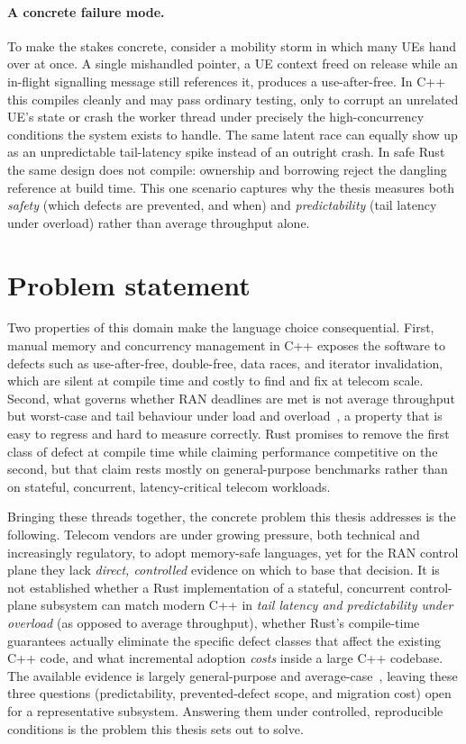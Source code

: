 \documentclass[english,twoside,openright,a4paper,censored,csm,software-track-2020]{HYthesisML}
\begin{document}
\paragraph{A concrete failure mode.}
To make the stakes concrete, consider a mobility storm in which many UEs hand over at once. A
single mishandled pointer, a UE context freed on release while an in-flight signalling message
still references it, produces a use-after-free. In C++ this compiles cleanly and may pass
ordinary testing, only to corrupt an unrelated UE's state or crash the worker thread under
precisely the high-concurrency conditions the system exists to handle. The same latent race
can equally show up as an unpredictable tail-latency spike instead of an outright crash. In
safe Rust the same design does not compile: ownership and borrowing reject the dangling
reference at build time. This one scenario captures why the thesis measures both
\emph{safety} (which defects are prevented, and when) and \emph{predictability} (tail
latency under overload) rather than average throughput alone.

\section{Problem statement}
Two properties of this domain make the language choice consequential. First, manual memory and
concurrency management in C++ exposes the software to defects such as use-after-free,
double-free, data races, and iterator invalidation, which are silent at compile time and costly
to find and fix at telecom scale. Second, what governs whether RAN deadlines are met is not
average throughput but worst-case and tail behaviour under load and
overload~\cite{dean2013tail}, a property that is easy to regress and hard to measure correctly.
Rust promises to remove the first class of defect at compile time while claiming performance
competitive on the second, but that claim rests mostly on general-purpose benchmarks rather
than on stateful, concurrent, latency-critical telecom workloads.

Bringing these threads together, the concrete problem this thesis addresses is the following.
Telecom vendors are under growing pressure, both technical and increasingly regulatory, to adopt
memory-safe languages, yet for the RAN control plane they lack \emph{direct, controlled}
evidence on which to base that decision. It is not established whether a Rust implementation of
a stateful, concurrent control-plane subsystem can match modern C++ in \emph{tail latency and
predictability under overload} (as opposed to average throughput), whether Rust's compile-time
guarantees actually eliminate the specific defect classes that affect the existing C++ code,
and what incremental adoption \emph{costs} inside a large C++ codebase. The available evidence
is largely general-purpose and average-case~\cite{balasubramanian2017rust,qin2020rust}, leaving
these three questions (predictability, prevented-defect scope, and migration cost) open for a
representative subsystem. Answering them under controlled, reproducible conditions is the
problem this thesis sets out to solve.
\end{document}
